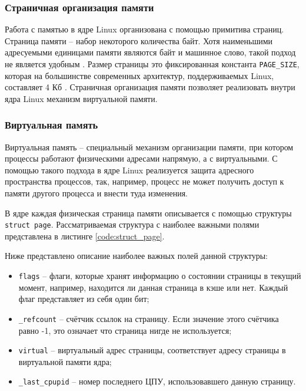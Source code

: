 \subsubsection{Страничная организация памяти}

Работа с памятью в ядре Linux организована с помощью примитива страниц. Страница памяти -- набор некоторого количества байт. Хотя наименьшими адресуемыми единицами памяти являются байт и машинное слово, такой подход не является удобным \cite{kernel-development}. Размер страницы это фиксированная константа \texttt{PAGE\_SIZE}, которая на большинстве современных архитектур, поддерживаемых Linux, составляет 4 Кб \cite{4kb-page-size}. Страничная организация памяти позволяет реализовать внутри ядра Linux механизм виртуальной памяти.

\subsubsection{Виртуальная память}

Виртуальная память -- специальный механизм организации памяти, при котором процессы работают физическими адресами напрямую, а с виртуальными. С помощью такого подхода в ядре Linux реализуется защита адресного пространства процессов, так, например, процесс не может получить доступ к памяти другого процесса и внести туда изменения.

В ядре каждая физическая страница памяти описывается с помощью структуры \texttt{struct page}. Рассматриваемая структура с наиболее важными полями представлена в листинге \ref{code:struct_page}.


Ниже представлено описание наиболее важных полей данной структуры:

\begin{itemize}
	\item \texttt{flags} -- флаги, которые хранят информацию о состоянии страницы в текущий момент, например, находится ли данная страница в кэше или нет. Каждый флаг представляет из себя один бит;
	\item \texttt{\_refcount} -- счётчик ссылок на страницу. Если значение этого счётчика равно -1, это означает что страница нигде не используется;
	\item \texttt{virtual} -- виртуальный адрес страницы, соответствует адресу страницы в виртуальной памяти ядра;
	\item \texttt{\_last\_cpupid} -- номер последнего ЦПУ, использовавшего данную страницу.
\end{itemize}

